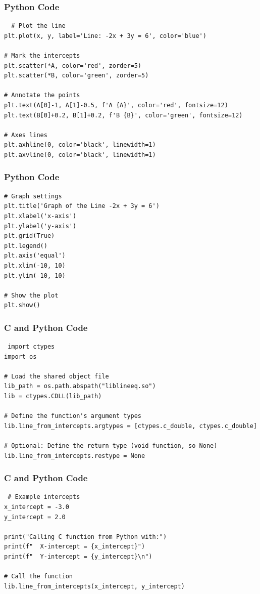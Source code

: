 \documentclass{beamer}
\begin{document}
\begin{frame}[fragile]
\frametitle{Python Code}
\begin{lstlisting}
  # Plot the line
plt.plot(x, y, label='Line: -2x + 3y = 6', color='blue')

# Mark the intercepts
plt.scatter(*A, color='red', zorder=5)
plt.scatter(*B, color='green', zorder=5)

# Annotate the points
plt.text(A[0]-1, A[1]-0.5, f'A {A}', color='red', fontsize=12)
plt.text(B[0]+0.2, B[1]+0.2, f'B {B}', color='green', fontsize=12)

# Axes lines
plt.axhline(0, color='black', linewidth=1)
plt.axvline(0, color='black', linewidth=1)

\end{lstlisting}
\end{frame}
\begin{frame}[fragile]
    \frametitle{Python Code}
    \begin{lstlisting}
# Graph settings
plt.title('Graph of the Line -2x + 3y = 6')
plt.xlabel('x-axis')
plt.ylabel('y-axis')
plt.grid(True)
plt.legend()
plt.axis('equal')
plt.xlim(-10, 10)
plt.ylim(-10, 10)

# Show the plot
plt.show()

\end{lstlisting}
\end{frame}
\begin{frame}[fragile]
\frametitle{C and Python Code}
\begin{lstlisting}
 import ctypes
import os

# Load the shared object file
lib_path = os.path.abspath("liblineeq.so")
lib = ctypes.CDLL(lib_path)

# Define the function's argument types
lib.line_from_intercepts.argtypes = [ctypes.c_double, ctypes.c_double]

# Optional: Define the return type (void function, so None)
lib.line_from_intercepts.restype = None

\end{lstlisting}
\end{frame}
\begin{frame}[fragile]
\frametitle{C and Python Code}
\begin{lstlisting}
 # Example intercepts
x_intercept = -3.0
y_intercept = 2.0

print("Calling C function from Python with:")
print(f"  X-intercept = {x_intercept}")
print(f"  Y-intercept = {y_intercept}\n")

# Call the function
lib.line_from_intercepts(x_intercept, y_intercept)
\end{lstlisting}
\end{frame}
\end{document}
